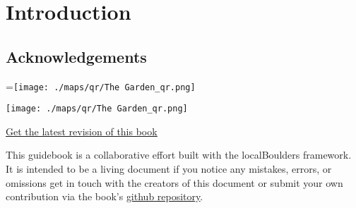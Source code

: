 \thispagestyle{empty}
\chapter*{Introduction}

\fancyhead{}
\fancyhead[RO]{}

\raggedcolumns
\begin{multicols}{2}

\section{Acknowledgements}
=\hbox{\texttt{[image: ./maps/qr/The Garden\_qr.png]}}%
\begin{center}
\texttt{[image: ./maps/qr/The Garden\_qr.png]}
\end{center}
\begin{center}
\underline{\textcolor{blue}{\href{https://github.com/AndrewChild/The-Garden-Guidebook/raw/main/guideBook.pdf}{Get the latest revision of this book}}}
\end{center}

This guidebook is a collaborative effort built with the localBoulders framework. It is intended to be a living document if you notice any mistakes, errors, or omissions get in touch with the creators of this document or submit your own contribution via the book's \underline{\textcolor{blue}{\href{https://andrewchild.github.io/The-Garden-Guidebook/}{github repository}}}.
\end{multicols}
\clearpage